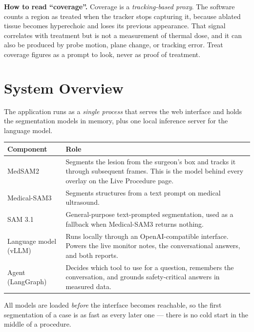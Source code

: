 \documentclass[11pt,a4paper]{article}
\begin{document}
\begin{warnbox}
\textbf{How to read ``coverage''.} Coverage is a \emph{tracking-based proxy}.
The software counts a region as treated when the tracker stops capturing it,
because ablated tissue becomes hyperechoic and loses its previous appearance.
That signal correlates with treatment but is not a measurement of thermal
dose, and it can also be produced by probe motion, plane change, or tracking
error. Treat coverage figures as a prompt to look, never as proof of
treatment.
\end{warnbox}

\section{System Overview}

The application runs as a \emph{single process} that serves the web interface
and holds the segmentation models in memory, plus one local inference server
for the language model.

\begin{longtable}{@{}p{4.2cm}p{10.8cm}@{}}
\toprule
\textbf{Component} & \textbf{Role} \\
\midrule
\endhead
MedSAM2 & Segments the lesion from the surgeon's box and tracks it through
subsequent frames. This is the model behind every overlay on the Live
Procedure page. \\
\addlinespace
Medical-SAM3 & Segments structures from a text prompt on medical ultrasound. \\
\addlinespace
SAM 3.1 & General-purpose text-prompted segmentation, used as a fallback when
Medical-SAM3 returns nothing. \\
\addlinespace
Language model (vLLM) & Runs locally through an OpenAI-compatible interface.
Powers the live monitor notes, the conversational answers, and both reports. \\
\addlinespace
Agent (LangGraph) & Decides which tool to use for a question, remembers the
conversation, and grounds safety-critical answers in measured data. \\
\bottomrule
\end{longtable}

All models are loaded \emph{before} the interface becomes reachable, so the
first segmentation of a case is as fast as every later one --- there is no
cold start in the middle of a procedure.
\end{document}
